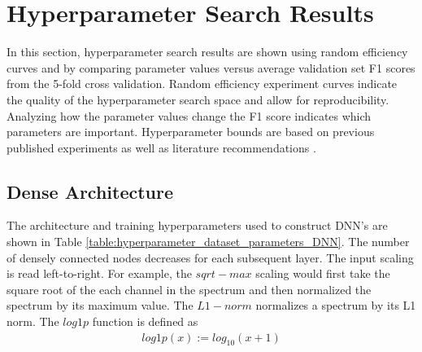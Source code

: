 \section{Hyperparameter Search Results}

In this section, hyperparameter search results are shown using random efficiency curves and by comparing parameter values versus average validation set F1 scores from the 5-fold cross validation. Random efficiency experiment curves indicate the quality of the hyperparameter search space and allow for reproducibility. Analyzing how the parameter values change the F1 score indicates which parameters are important. Hyperparameter bounds are based on previous published experiments as well as literature recommendations \cite{kamuda2017, kamuda2018, Bengio2018}.





\subsection{Dense Architecture}

The architecture and training hyperparameters used to construct DNN's are shown in Table \ref{table:hyperparameter_dataset_parameters_DNN}. The number of densely connected nodes decreases for each subsequent layer. The input scaling is read left-to-right. For example, the $sqrt-max$ scaling would first take the square root of the each channel in the spectrum and then normalized the spectrum by its maximum value. The $L1-norm$ normalizes a spectrum by its L1 norm. The $log1p$ function is defined as 
\begin{align} \label{eq:single_layer_eq_sum}
log1p(x) := log_{10}(x+1)
\end{align}

